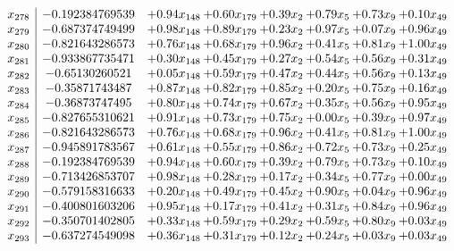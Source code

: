 \documentclass[8pt]{article}
\begin{document}
\[\begin{array}{c| c c@{\hskip 2pt} c@{\hskip 2pt} c@{\hskip 2pt} c@{\hskip 2pt} c@{\hskip 2pt} c@{\hskip 2pt} }
 x_{278}   &  -0.192384769539 & +  0.94 x_{148} & +  0.60 x_{179} & +  0.39 x_{2} & +  0.79 x_{5} & +  0.73 x_{9} & +  0.10 x_{49}\\
 x_{279}   &  -0.687374749499 & +  0.98 x_{148} & +  0.89 x_{179} & +  0.23 x_{2} & +  0.97 x_{5} & +  0.07 x_{9} & +  0.96 x_{49}\\
 x_{280}   &  -0.821643286573 & +  0.76 x_{148} & +  0.68 x_{179} & +  0.96 x_{2} & +  0.41 x_{5} & +  0.81 x_{9} & +  1.00 x_{49}\\
 x_{281}   &  -0.933867735471 & +  0.30 x_{148} & +  0.45 x_{179} & +  0.27 x_{2} & +  0.54 x_{5} & +  0.56 x_{9} & +  0.31 x_{49}\\
 x_{282}   &  -0.65130260521 & +  0.05 x_{148} & +  0.59 x_{179} & +  0.47 x_{2} & +  0.44 x_{5} & +  0.56 x_{9} & +  0.13 x_{49}\\
 x_{283}   &  -0.35871743487 & +  0.87 x_{148} & +  0.82 x_{179} & +  0.85 x_{2} & +  0.20 x_{5} & +  0.75 x_{9} & +  0.16 x_{49}\\
 x_{284}   &  -0.36873747495 & +  0.80 x_{148} & +  0.74 x_{179} & +  0.67 x_{2} & +  0.35 x_{5} & +  0.56 x_{9} & +  0.95 x_{49}\\
 x_{285}   &  -0.827655310621 & +  0.91 x_{148} & +  0.73 x_{179} & +  0.75 x_{2} & +  0.00 x_{5} & +  0.39 x_{9} & +  0.97 x_{49}\\
 x_{286}   &  -0.821643286573 & +  0.76 x_{148} & +  0.68 x_{179} & +  0.96 x_{2} & +  0.41 x_{5} & +  0.81 x_{9} & +  1.00 x_{49}\\
 x_{287}   &  -0.945891783567 & +  0.61 x_{148} & +  0.55 x_{179} & +  0.86 x_{2} & +  0.72 x_{5} & +  0.73 x_{9} & +  0.25 x_{49}\\
 x_{288}   &  -0.192384769539 & +  0.94 x_{148} & +  0.60 x_{179} & +  0.39 x_{2} & +  0.79 x_{5} & +  0.73 x_{9} & +  0.10 x_{49}\\
 x_{289}   &  -0.713426853707 & +  0.98 x_{148} & +  0.28 x_{179} & +  0.17 x_{2} & +  0.34 x_{5} & +  0.77 x_{9} & +  0.00 x_{49}\\
 x_{290}   &  -0.579158316633 & +  0.20 x_{148} & +  0.49 x_{179} & +  0.45 x_{2} & +  0.90 x_{5} & +  0.04 x_{9} & +  0.96 x_{49}\\
 x_{291}   &  -0.400801603206 & +  0.95 x_{148} & +  0.17 x_{179} & +  0.41 x_{2} & +  0.31 x_{5} & +  0.84 x_{9} & +  0.96 x_{49}\\
 x_{292}   &  -0.350701402805 & +  0.33 x_{148} & +  0.59 x_{179} & +  0.29 x_{2} & +  0.59 x_{5} & +  0.80 x_{9} & +  0.03 x_{49}\\
 x_{293}   &  -0.637274549098 & +  0.36 x_{148} & +  0.31 x_{179} & +  0.12 x_{2} & +  0.24 x_{5} & +  0.03 x_{9} & +  0.03 x_{49}\\

\end{array}\]
\end{document}
